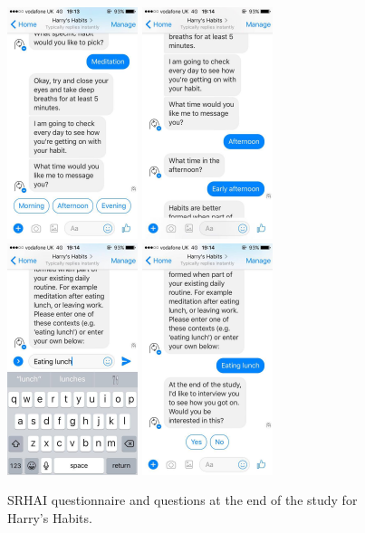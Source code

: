 \begin{figure}[H]
  \newline
  \newline
  \includegraphics[width=1.5in]{resources/design/process/9.jpg}
  \hspace{10px}
  \includegraphics[width=1.5in]{resources/design/process/10.jpg}
  \hspace{10px}
  \includegraphics[width=1.5in]{resources/design/process/11.jpg}
  \hspace{10px}
  \includegraphics[width=1.5in]{resources/design/process/12.jpg}
  \caption{SRHAI questionnaire and questions at the end of the study for Harry's Habits.}
\end{figure}